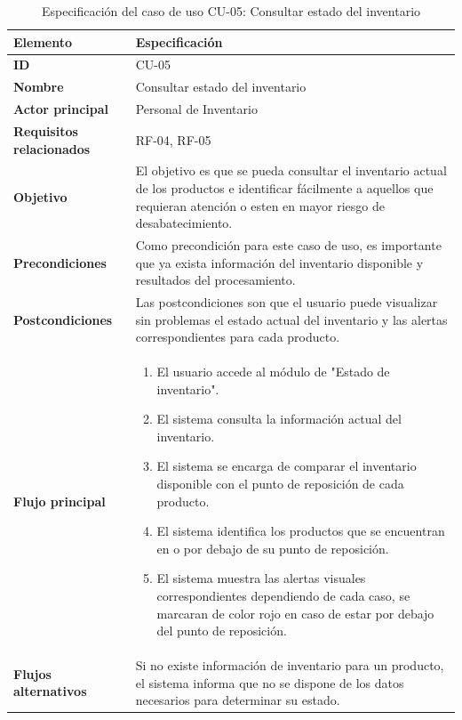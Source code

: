 \begin{table}[H]
\centering
\caption{Especificación del caso de uso CU-05: Consultar estado del inventario}
\label{tab:cu05_estado_inventario}
\renewcommand{\arraystretch}{1.3}
\begin{tabularx}{\textwidth}{|>{\bfseries}p{3.5cm}|X|}
\hline
Elemento & Especificación \\
\hline
ID & CU-05 \\
\hline
Nombre & Consultar estado del inventario \\
\hline
Actor principal & Personal de Inventario \\
\hline
Requisitos relacionados & RF-04, RF-05 \\
\hline
Objetivo & El objetivo es que se pueda consultar el inventario actual de los productos e identificar fácilmente a aquellos que requieran atención o esten en mayor riesgo de desabatecimiento. \\
\hline
Precondiciones & Como precondición para este caso de uso, es importante que ya exista información del inventario disponible y resultados del procesamiento. \\
\hline
Postcondiciones & Las postcondiciones son que el usuario puede visualizar sin problemas el estado actual del inventario y las alertas correspondientes para cada producto. \\
\hline
Flujo principal &
\begin{enumerate}
    \item El usuario accede al módulo de "Estado de inventario".
    \item El sistema consulta la información actual del inventario.
    \item El sistema se encarga de comparar el inventario disponible con el punto de reposición de cada producto.
    \item El sistema identifica los productos que se encuentran en o por debajo de su punto de reposición.
    \item El sistema muestra las alertas visuales correspondientes dependiendo de cada caso, se marcaran de color rojo en caso de estar por debajo del punto de reposición.
\end{enumerate} \\
\hline
Flujos alternativos & Si no existe información de inventario para un producto, el sistema informa que no se dispone de los datos necesarios para determinar su estado. \\
\hline
\end{tabularx}
\end{table}

